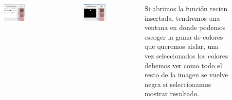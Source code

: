 \begin{frame}
	\begin{columns}
		\begin{figure}
			\begin{center}
				\includegraphics[width=0.7\textwidth]{images/01-vision-artificial/07.png}
			\end{center}
		\end{figure}
		\begin{figure}
			\begin{center}
				\includegraphics[width=0.7\textwidth]{images/01-vision-artificial/08.png}
			\end{center}
		\end{figure}

		Si abrimos la función recien insertada, tendremos una ventana en donde podemos escoger la gama de colores que queremos aislar, una vez seleccionados los colores debemos ver como todo el resto de la imagen se vuelve negra si seleccionamos mostrar resultado.
	\end{columns}
\end{frame}

